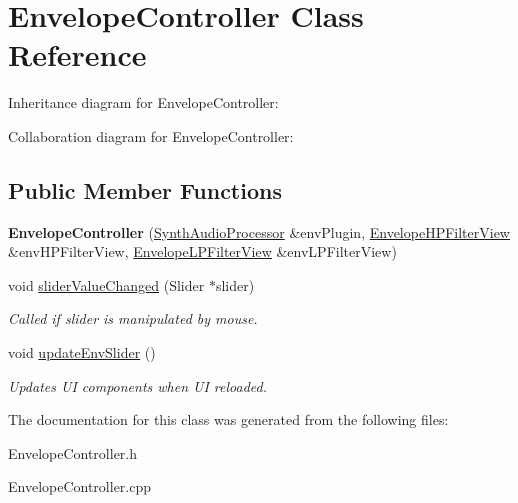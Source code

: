 \hypertarget{class_envelope_controller}{}\section{Envelope\+Controller Class Reference}
\label{class_envelope_controller}


Inheritance diagram for Envelope\+Controller\+:


Collaboration diagram for Envelope\+Controller\+:
\subsection*{Public Member Functions}
\begin{DoxyCompactItemize}
\item 
{\bfseries Envelope\+Controller} (\hyperlink{class_synth_audio_processor}{Synth\+Audio\+Processor} \&env\+Plugin, \hyperlink{class_envelope_h_p_filter_view}{Envelope\+H\+P\+Filter\+View} \&env\+H\+P\+Filter\+View, \hyperlink{class_envelope_l_p_filter_view}{Envelope\+L\+P\+Filter\+View} \&env\+L\+P\+Filter\+View)\hypertarget{class_envelope_controller_a323afa5eeb81491839e9f8f03dc336eb}{}\label{class_envelope_controller_a323afa5eeb81491839e9f8f03dc336eb}

\item 
void \hyperlink{class_envelope_controller_ad78be3826d083131eebf9270ea87d692}{slider\+Value\+Changed} (Slider $\ast$slider)\hypertarget{class_envelope_controller_ad78be3826d083131eebf9270ea87d692}{}\label{class_envelope_controller_ad78be3826d083131eebf9270ea87d692}

\begin{DoxyCompactList}\small\item\em Called if slider is manipulated by mouse. \end{DoxyCompactList}\item 
void \hyperlink{class_envelope_controller_afe0d37c0d4d3b01c80901be56783b93e}{update\+Env\+Slider} ()\hypertarget{class_envelope_controller_afe0d37c0d4d3b01c80901be56783b93e}{}\label{class_envelope_controller_afe0d37c0d4d3b01c80901be56783b93e}

\begin{DoxyCompactList}\small\item\em Updates UI components when UI reloaded. \end{DoxyCompactList}\end{DoxyCompactItemize}


The documentation for this class was generated from the following files\+:\begin{DoxyCompactItemize}
\item 
Envelope\+Controller.\+h\item 
Envelope\+Controller.\+cpp\end{DoxyCompactItemize}
